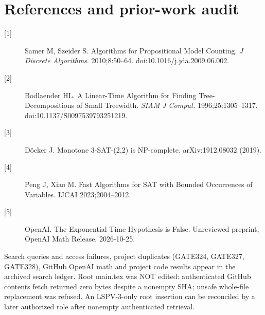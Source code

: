 \documentclass[11pt]{article}
\begin{document}
\section{References and prior-work audit}
\begin{description}
\item[{[1]}] Samer M, Szeider S. Algorithms for Propositional Model Counting. \emph{J Discrete Algorithms}. 2010;8:50--64. doi:10.1016/j.jda.2009.06.002.
\item[{[2]}] Bodlaender HL. A Linear-Time Algorithm for Finding Tree-Decompositions of Small Treewidth. \emph{SIAM J Comput}. 1996;25:1305--1317. doi:10.1137/S0097539793251219.
\item[{[3]}] D\"ocker J. Monotone 3-SAT-(2,2) is NP-complete. arXiv:1912.08032 (2019).
\item[{[4]}] Peng J, Xiao M. Fast Algorithms for SAT with Bounded Occurrences of Variables. IJCAI 2023;2004--2012.
\item[{[5]}] OpenAI. The Exponential Time Hypothesis is False. Unreviewed preprint, OpenAI Math Release, 2026-10-25.
\end{description}
Search queries and access failures, project duplicates (GATE324, GATE327, GATE328), GitHub OpenAI math and project code results appear in the archived search ledger. Root main.tex was NOT edited: authenticated GitHub contents fetch returned zero bytes despite a nonempty SHA; unsafe whole-file replacement was refused. An LSPV-3-only root insertion can be reconciled by a later authorized role after nonempty authenticated retrieval.
\end{document}
